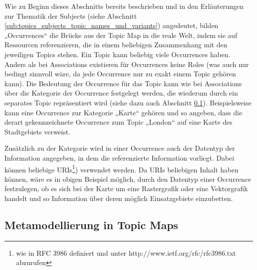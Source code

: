 Wie zu Beginn dieses Abschnitts bereits beschrieben und in den Erläuterungen zur Thematik der Subjects (siehe Abschnitt \ref{sub:topics_subjects_topic_names_und_variants}) angedeutet, bilden „Occurrences“ die Brücke aus der Topic Map in die reale Welt, indem sie auf Ressourcen referenzieren, die in einem beliebigen Zusammenhang mit den jeweiligen Topics stehen. Ein Topic kann beliebig viele Occurrences haben. Anders als bei Associations existieren für Occurrences keine Roles (was auch nur bedingt sinnvoll wäre, da jede Occurrence nur zu exakt einem Topic gehören kann). Die Bedeutung der Occurrence für das Topic kann wie bei Associations über die Kategorie der Occurrence festgelegt werden, die wiederum durch ein separates Topic repräsentiert wird (siehe dazu auch Abschnitt \ref{sub:metamodellierung_in_topic_maps}). Beispielsweise kann eine Occurrence zur Kategorie „Karte“ gehören und so angeben, dass die derart gekennzeichnete Occurrence zum Topic „London“ auf eine Karte des Stadtgebiets verweist.

Zusätzlich zu der Kategorie wird in einer Occurrence auch der Datentyp der Information angegeben, in dem die referenzierte Information vorliegt. Dabei können beliebige \glspl{URI}\footnote{wie in RFC 3986 definiert und unter http://www.ietf.org/rfc/rfc3986.txt abzurufen}) verwendet werden. Da URIs beliebigen Inhalt haben können, wäre es in obigen Beispiel möglich, durch den Datentyp einer Occurrence festzulegen, ob es sich bei der Karte um eine Rastergrafik oder eine Vektorgrafik handelt und so Information über deren möglich Einsatzgebiete einzubetten.


\subsection{Metamodellierung in Topic Maps} %
\label{sub:metamodellierung_in_topic_maps}

